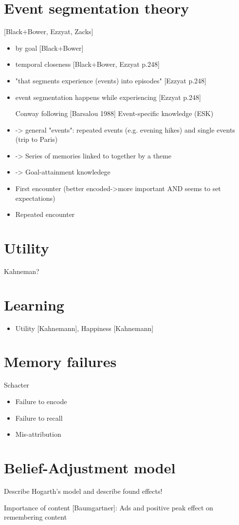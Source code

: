 \section{Event segmentation theory}
[Black+Bower, Ezzyat, Zacks]
\begin{itemize}
\item by goal [Black+Bower]
\item temporal closeness [Black+Bower, Ezzyat p.248]
\item "that segments experience (events) into episodes" [Ezzyat p.248]
\item event segmentation happens while experiencing [Ezzyat p.248]

\item [Conway] following [Barsalou 1988] Event-specific knowledge (ESK)
\item -> general "events": repeated events (e.g. evening hikes) and single events (trip to Paris)
\item -> Series of memories linked to together by a theme
\item -> Goal-attainment knowledege
\item First encounter (better encoded->more important AND seems to set expectations)
\item Repeated encounter
\end{itemize}

\section{Utility}
Kahneman?

\section{Learning}
\begin{itemize}
\item Utility [Kahnemann],  Happiness [Kahnemann]
\end{itemize}

\section{Memory failures}
Schacter

\begin{itemize}
\item Failure to encode
\item Failure to recall
\item Mis-attribution
\end{itemize}


\section{Belief-Adjustment model}
Describe Hogarth's model and describe found effects!

Importance of content [Baumgartner]: Ads and positive peak effect on remembering content